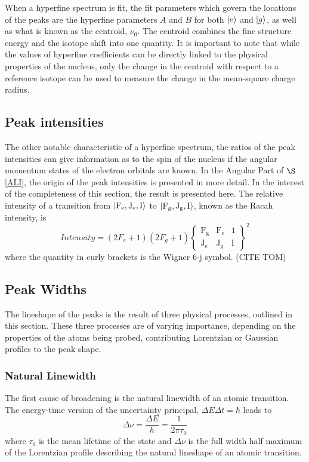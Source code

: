 When a hyperfine spectrum is fit, the fit parameters which govern the locations of the peaks are the hyperfine parameters $A$ and $B$ for both $\ket{e}$ and $\ket{g}$, as well as what is known as the centroid, $\nu_0$. The centroid combines the fine structure energy and the isotope shift into one quantity. It is important to note that while the values of hyperfine coefficients can be directly linked to the physical properties of the nucleus, only the change in the centroid with respect to a reference isotope can be used to measure the change in the mean-square charge radius.

\subsection{Peak intensities} 
The other notable characteristic of a hyperfine spectrum, the ratios of the peak intensities can give information as to the spin of the nucleus if the angular momentum states of the electron orbitals are known. In the Angular Part of $\S$ \ref{ALI}, the origin of the peak intensities is presented in more detail. In the interest of the completeness of this section, the result is presented here. The relative intensity of a transition from $\ket{\mathrm{F_e,J_e,I}}$ to $\ket{\mathrm{F_g,J_g,I}}$, known as the Racah intensity,  is
\begin{equation}
Intensity = (2F_e+1)(2F_g+1)
\left\lbrace
\mathrm{
\begin{matrix}
F_g & F_e & 1\\
J_e & J_g & I 
\end{matrix}
}
\right\rbrace^2
\label{RACAH}
\end{equation}
where the quantity in curly brackets is the Wigner 6-j symbol. (CITE TOM)
\subsection{Peak Widths}
The lineshape of the peaks is the result of three physical processes, outlined in this section. These three processes are of varying importance, depending on the properties of the atoms being probed, contributing Lorentzian or Gaussian profiles to the peak shape. 

\subsubsection{Natural Linewidth}
The first cause of broadening is the natural linewidth of an atomic transition. The energy-time version of the uncertainty principal, $\Delta E \Delta t= \hbar$ leads to 
\begin{equation}
\Delta \nu = \frac{\Delta E}{h}=\frac{1}{2 \pi \tau_0}
\end{equation}
where $\tau_0$ is the mean lifetime of the state and $\Delta \nu$ is the full width half maximum of the Lorentzian profile describing the natural lineshape of an atomic transition.\cite{TomT}


